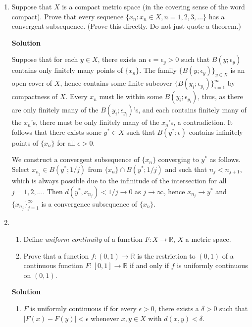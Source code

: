 \documentclass{article}
\begin{document}
\begin{enumerate}
\item Suppose that \(X\) is a compact metric space (in the covering sense of the word compact).  Prove that every sequence \(\{x_n : x_n \in X, n = 1, 2, 3, \ldots\}\) has a convergent subsequence.  (Prove this directly.  Do not just quote a theorem.)

{\bf Solution}

Suppose that for each \(y \in X\), there exists an \(\epsilon = \epsilon_y > 0\) such that \(B(y; \epsilon_y)\) contains only finitely many points of \(\{x_n\}\).  The family \(\{B(y; \epsilon_y)\}_{y \in X}\) is an open cover of \(X\), hence contains some finite subcover \(\{B(y_i; \epsilon_{y_i})\}_{i = 1}^m\) by compactness of \(X\).  Every \(x_n\) must lie within some \(B(y_i; \epsilon_{y_i})\), thus, as there are only finitely many of the \(B(y_i; \epsilon_{y_i})\)'s, and each contains finitely many of the \(x_n\)'s, there must be only finitely many of the \(x_n\)'s, a contradiction.  It follows that there exists some \(y^* \in X\) such that \(B(y^*; \epsilon)\) contains infinitely points of \(\{x_n\}\) for all \(\epsilon > 0\).

We construct a convergent subsequence of \(\{x_n\}\) converging to \(y^*\) as follows.  Select \(x_{n_j} \in B(y^*; 1/j)\) from \(\{x_n\} \cap B(y^*; 1/j)\) and such that \(n_j < n_{j + 1}\), which is always possible due to the infinitude of the intersection for all \(j = 1, 2, \ldots\).  Then \(d(y^*, x_{n_j}) < 1/j \to 0\) as \(j \to \infty\), hence \(x_{n_j} \to y^*\) and \(\{x_{n_j}\}_{j = 1}^{\infty}\) is a convergence subsequence of \(\{x_n\}\).



\item

\begin{enumerate}
\item Define {\em uniform continuity} of a function \(F : X \to \mathbb{R}\), \(X\) a metric space.

\item Prove that a function \(f : (0,1) \to \mathbb{R}\) is the restriction to \((0,1)\) of a continuous function \(F : [0,1] \to \mathbb{R}\) if and only if \(f\) is uniformly continuous on \((0,1)\).

\end{enumerate}

{\bf Solution}

\begin{enumerate}
\item \(F\) is uniformly continuous if for every \(\epsilon > 0\), there exists a \(\delta > 0\) such that \(|F(x) - F(y)| < \epsilon\) whenever \(x,y \in X\) with \(d(x,y) < \delta\).


\end{enumerate}
\end{enumerate}
\end{document}
